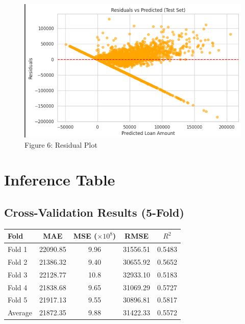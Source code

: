 \documentclass[12pt]{article}
\begin{document}
  \begin{figure}
      \centering
      \includegraphics[width=0.5\linewidth]{im3.png}
      \caption{Figure 6: Residual Plot}
      \label{fig:enter-label}
  \end{figure}
  


\section*{Inference Table}

\subsection*{Cross-Validation Results (5-Fold)}
\begin{tabular}{lcccc}
\toprule
Fold & MAE & MSE ($\times 10^8$) & RMSE & $R^2$ \\
\midrule
Fold 1 & 22090.85 & 9.96 & 31556.51 & 0.5483 \\
Fold 2 & 21386.32 & 9.40 & 30655.92 & 0.5652 \\
Fold 3 & 22128.77 & 10.8 & 32933.10 & 0.5183 \\
Fold 4 & 21838.68 & 9.65 & 31069.29 & 0.5727 \\
Fold 5 & 21917.13 & 9.55 & 30896.81 & 0.5817 \\
\midrule
Average & 21872.35 & 9.88 & 31422.33 & 0.5572 \\
\bottomrule
\end{tabular}

\vspace{1em}
\end{document}
